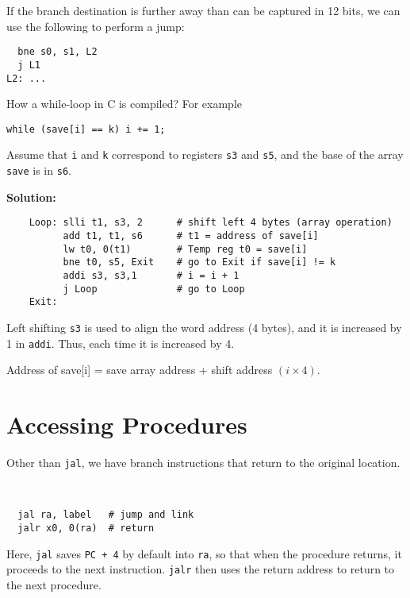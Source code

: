 If the branch destination is further away than can be captured in 12 bits, we can use the following to perform a jump:
\begin{verbatim}
  bne s0, s1, L2
  j L1
L2: ...
\end{verbatim}

\begin{eg}
  How a while-loop in C is compiled? For example 
  \begin{center}
    \verb|while (save[i] == k) i += 1;|
  \end{center}
  Assume that \verb|i| and \verb|k| correspond to registers \verb|s3| and \verb|s5|, and the base of the array \verb|save| is in \verb|s6|.

  \textbf{Solution:} 
  \color{red}
  \begin{verbatim}
    Loop: slli t1, s3, 2      # shift left 4 bytes (array operation)
          add t1, t1, s6      # t1 = address of save[i]
          lw t0, 0(t1)        # Temp reg t0 = save[i]
          bne t0, s5, Exit    # go to Exit if save[i] != k
          addi s3, s3,1       # i = i + 1
          j Loop              # go to Loop
    Exit:
  \end{verbatim}
\end{eg}
\begin{remark}
  Left shifting \verb|s3| is used to align the word address (4 bytes), and it is increased by 1 in \verb|addi|. Thus, each time it is increased by 4.

  Address of save[i] = save array address + shift address \((i \times 4)\).
\end{remark}

\section{Accessing Procedures}
Other than \verb|jal|, we have branch instructions that return to the original location.
\begin{codeBlock}~
\begin{verbatim}
  jal ra, label   # jump and link
  jalr x0, 0(ra)  # return
\end{verbatim}
\end{codeBlock}

Here, \verb|jal| saves \verb|PC + 4| by default into \verb|ra|, so that when the procedure returns, it proceeds to the next instruction. \verb|jalr| then uses the return address to return to the next procedure.

